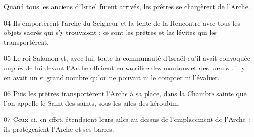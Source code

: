 Quand tous les anciens d’Israël furent arrivés, les prêtres se chargèrent de l’Arche.

04 Ils emportèrent l’arche du Seigneur et la tente de la Rencontre avec tous les objets sacrés qui s’y trouvaient ; ce sont les prêtres et les lévites qui les transportèrent.

05 Le roi Salomon et, avec lui, toute la communauté d’Israël qu’il avait convoquée auprès de lui devant l’Arche offrirent en sacrifice des moutons et des bœufs : il y en avait un si grand nombre qu’on ne pouvait ni le compter ni l’évaluer.

06 Puis les prêtres transportèrent l’Arche à sa place, dans la Chambre sainte que l’on appelle le Saint des saints, sous les ailes des kéroubim.

07 Ceux-ci, en effet, étendaient leurs ailes au-dessus de l’emplacement de l’Arche : ils protégeaient l’Arche et ses barres.